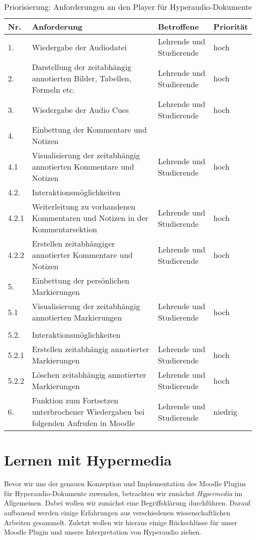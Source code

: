 \begin{table}[!ht]
\def\arraystretch{1.4}
\caption{Priorisierung: Anforderungen an den Player für Hyperaudio-Dokumente}
\label{tab:PriorisierungAnforderungenPlayer}
 \begin{tabularx}{\textwidth}{lXll}      
    \hline
    Nr. & Anforderung & Betroffene & Priorität
    \\\hline
    1. & Wiedergabe der Audiodatei & Lehrende und Studierende & hoch\\
    2. & Darstellung der zeitabhängig annotierten Bilder, Tabellen, Formeln etc. & Lehrende und Studierende & hoch\\
    3. & Wiedergabe der Audio Cues & Lehrende und Studierende & hoch\\
    4. & Einbettung der Kommentare und Notizen & \\
    4.1 & Visualisierung der zeitabhängig annotierten Kommentare und Notizen & Lehrende und Studierende & hoch\\
    4.2. & Interaktionsmöglichkeiten & \\
    4.2.1 & Weiterleitung zu vorhandenen Kommentaren und Notizen in der Kommentarsektion  & Lehrende und Studierende & hoch\\
    4.2.2 & Erstellen zeitabhängiger annotierter Kommentare und Notizen & Lehrende und Studierende & hoch\\
    5. & Einbettung der persönlichen Markierungen & \\
    5.1 & Visualisierung der zeitabhängig annotierten Markierungen & Lehrende und Studierende & hoch\\\\
    5.2. & Interaktionsmöglichkeiten & \\
    5.2.1 & Erstellen zeitabhängig annotierter Markierungen  & Lehrende und Studierende & hoch\\
    5.2.2 & Löschen zeitabhängig annotierter Markierungen & Lehrende und Studierende & hoch\\
    6. & Funktion zum Fortsetzen unterbrochener Wiedergaben bei folgenden Aufrufen in Moodle & Lehrende und Studierende & niedrig\\
    \hline
    \end{tabularx}
\end{table}

\section{Lernen mit Hypermedia}
Bevor wir uns der genauen Konzeption und Implementation des Moodle Plugins für Hyperaudio-Dokumente zuwenden, betrachten wir zunächst \textit{Hypermedia} im Allgemeinen. Dabei wollen wir zunächst eine Begriffsklärung durchführen. Darauf aufbauend werden einige Erfahrungen aus verschiedenen wissenschaftlichen Arbeiten gesammelt. Zuletzt wollen wir hieraus einige Rückschlüsse für unser Moodle Plugin und unsere Interpretation von Hyperaudio ziehen.

